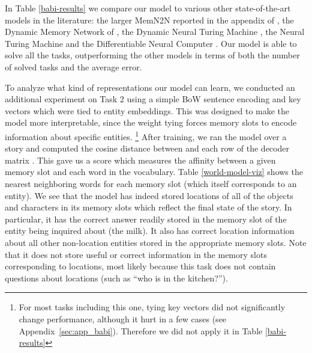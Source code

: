 \documentclass{article} \usepackage{iclr2016_conference,times}
\begin{document}
In Table \ref{babi-results} we compare our model to various other state-of-the-art models in the literature: the larger MemN2N reported in the appendix of \citep{MemN2N}, the Dynamic Memory Network of \citep{DMN}, the Dynamic Neural Turing Machine \citep{DNTM}, the Neural Turing Machine \citep{NTM} and the Differentiable Neural Computer \citep{graves2016hybrid}.
Our model is able to solve all the tasks, outperforming the other models in terms of both the number of solved tasks and the average error. 

To analyze what kind of representations our model can learn, we conducted an additional experiment on Task 2 using a simple BoW sentence encoding and key vectors which were tied to entity embeddings. 
This was designed to make the model more interpretable, since the weight tying forces memory slots to encode information about specific entities. \footnote{For most tasks including this one, tying key vectors did not significantly change performance, although it hurt in a few cases (see Appendix~\ref{sec:app_babi}). Therefore we did not apply it in Table \ref{babi-results}}
After training, we ran the model over a story and computed the cosine distance between  and each row  of the decoder matrix . This gave us a score which measures the affinity between a given memory slot and each word in the vocabulary. 
Table \ref{world-model-viz} shows the nearest neighboring words for each memory slot (which itself corresponds to an entity). 
We see that the model has indeed stored locations of all of the objects and characters in its memory slots which reflect the final state of the story. In particular, it has the correct answer readily stored in the memory slot of the entity being inquired about (the milk). It also has correct location information about all other non-location entities stored in the appropriate memory slots. 
Note that it does not store useful or correct information in the memory slots corresponding to locations, most likely because this task does not contain questions about locations (such as ``who is in the kitchen?''). 
\end{document}
